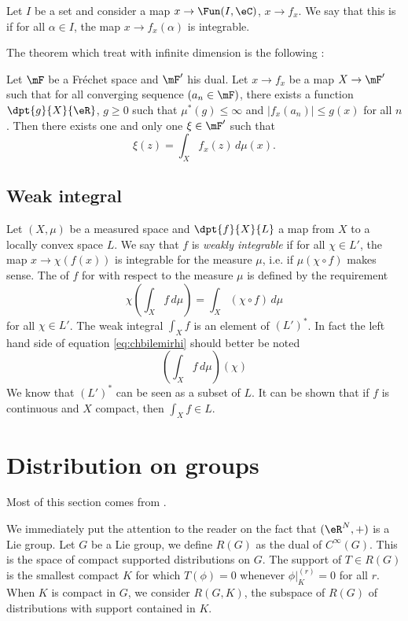 Let $I$ be a set and consider a map $x\to\Fun(I,\eC)$, $x\to f_x$. We say that this is  if for all $\alpha\in I$, the map $x\to f_x(\alpha)$ is integrable.

The theorem which treat with infinite dimension is the following :

\begin{theorem}
   Let $\mF$ be a Fréchet space and $\mF'$ his dual. Let $x\to f_x$ be a map $X\to\mF'$ such that for all converging sequence $(a_n\in\mF)$, there exists a function  $\dpt{g}{X}{\eR}$, $g\geq0$ such that $\mu^*(g)\leq\infty$ and $| f_x(a_n) |\leq g(x)$ for all $n$. Then there exists one and only one $\xi\in\mF'$ such that
\begin{equation}
  \xi(z)=\int_Xf_x(z)\,d\mu(x).
\end{equation}

\end{theorem}

\subsection{Weak integral}

Let $(X,\mu)$ be a measured space and $\dpt{f}{X}{L}$ a map from $X$ to a locally convex space $L$. We say that $f$ is \emph{weakly integrable} if for all $\chi\in L'$, the map $x\to \chi(f(x))$ is integrable for the measure $\mu$, i.e. if $\mu(\chi\circ f)$ makes sense. The  of $f$ for with respect to the measure $\mu$ is defined by the requirement
\begin{equation} \label{eq:chbilemirhi}
  \chi\left( \int_Xf\,d\mu \right)=\int_X(\chi\circ f)\,d\mu
\end{equation}
for all $\chi\in L'$. The weak integral $\int_Xf$ is an element of $(L')^*$. In fact the left hand side of equation \eqref{eq:chbilemirhi} should better be noted
\[ 
  \left( \int_Xf\,d\mu \right)(\chi)
\]
We know that $(L')^*$ can be seen as a subset of $L$. It can be shown that if $f$ is continuous and $X$ compact, then $\int_Xf\in L$.
%
   \section{Distribution on groups}
%

Most of this section comes from \cite{Kirillov}.

We immediately put the attention to the reader on the fact that $(\eR^N,+)$ is a Lie group. Let $G$ be a Lie group, we define $R(G)$ as the dual of $ C^{\infty}(G)$. This is the space of compact supported distributions on $G$. The support of $T\in R(G)$ is the smallest compact $K$ for which $T(\phi)=0$ whenever $\phi|_K^{(r)}=0$ for all $r$. When $K$ is compact in $G$, we consider $R(G,K)$, the subspace of $R(G)$ of distributions with support contained in $K$. 


